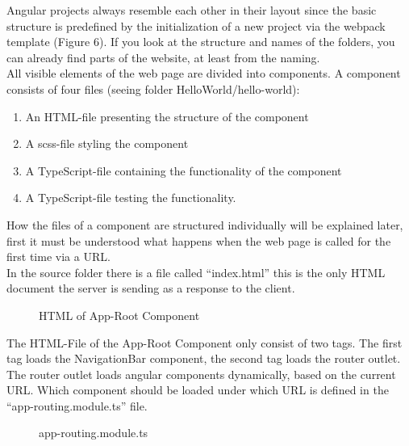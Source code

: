 Angular projects always resemble each other in their layout since the basic structure is predefined by the
initialization of a new project via the webpack template (Figure 6).
If you look at the structure and names of the folders, you can already find parts of the website, at least from the
naming. \\
All visible elements of the web page are divided into components.
A component consists of four files (seeing folder HelloWorld/hello-world):

\begin{enumerate}
    \item An HTML-file presenting the structure of the component
    \item A scss-file styling the component
    \item A TypeScript-file containing the functionality of the component
    \item A TypeScript-file testing the functionality.
\end{enumerate}

How the files of a component are structured individually will be explained later, first it must be understood what
happens when the web page is called for the first time via a URL. \\
In the source folder there is a file called \enquote{index.html} this is the only HTML document the server is sending
as a response to the client.

\begin{figure}[H]
    \centering
    \caption{HTML of App-Root Component}
    \label{fig:htmlapproot}
\end{figure}

The HTML-File of the App-Root Component only consist of two tags.
The first tag loads the NavigationBar component, the second tag loads the router outlet.
The router outlet loads angular components dynamically, based on the current URL.
Which component should be loaded under which URL is defined in the \enquote{app-routing.module.ts} file.

\begin{figure}[H]
    \centering
    \caption{app-routing.module.ts}
    \label{fig:approutingmodule}
\end{figure}

